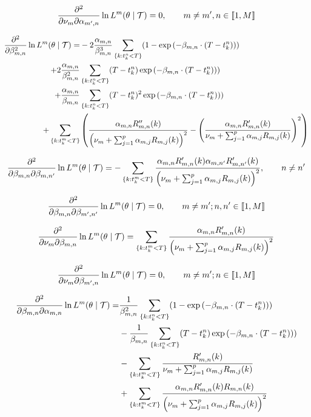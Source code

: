 \begin{equation}
\frac{\partial^2  } {\partial \nu_m \partial \alpha_{m',n} } \ln L^m ( \theta \mid \mathcal{T} ) = 0 , \qquad m \neq m', n \in  \llbracket 1, M \rrbracket
\end{equation}



\begin{align}
\frac{\partial^2 } {\partial \beta_{m,n}^2} \ln L^m ( \theta \mid \mathcal{T} ) = & - 2 \frac {\alpha_{m,n}} {\beta_{m,n}^3} \sum_{ \{k : t_k^n < T \} } ( 1 - \exp \left ( - \beta_{m,n} \cdot ( T - t_k^n ) \right ) ) \notag \\ 
+  2 \frac{ \alpha_{m,n} } { \beta_{m,n}^2 } & \sum_{ \{k : t_k^n < T \} } ( T-t_k^n) \exp \left ( - \beta_{m,n} \cdot ( T - t_k^n ) \right ) )  \notag \\
+ \frac{ \alpha_{m,n} } { \beta_{m,n} } & \sum_{ \{k : t_k^n < T \} } ( T-t_k^n)^2 \exp \left ( - \beta_{m,n} \cdot ( T - t_k^n ) \right ) )  \notag \\ 
+ \sum_{ \{k : t_k^m < T \} } & \left (  \frac{\alpha_{m,n} R''_{m,n} (k) }{ \left ( \nu_m + \sum_{j=1}^p \alpha_{m,j} R_{m,j} (k) \right )^2} - \left ( \frac{\alpha_{m,n} R'_{m,n} (k) }{ \nu_m + \sum_{j=1}^p \alpha_{m,j} R_{m,j} (k)} \right )^2 \right ) 
\end{align}

\begin{equation}
\frac{\partial^2 } {\partial \beta_{m,n} \partial \beta_{m,n'} } \ln L^m ( \theta \mid \mathcal{T} ) =  - \sum_{ \{k : t_k^m < T \} } \frac{\alpha_{m,n} R'_{m,n}(k) \alpha_{m,n'} R'_{m,n'}(k) }{ \left ( \nu_m + \sum_{j=1}^p \alpha_{m,j} R_{m,j} (k) \right )^2}, \qquad n\neq n'
\end{equation}

\begin{equation}
\frac{\partial^2 } {\partial \beta_{m,n} \partial \beta_{m',n'} } \ln L^m ( \theta \mid \mathcal{T} ) = 0, \qquad m \neq m'; n,n' \in  \llbracket 1, M \rrbracket
\end{equation}



\begin{equation}
\frac{\partial^2 } {\partial \nu_m \partial \beta_{m,n} } \ln L^m ( \theta \mid \mathcal{T} ) = \sum_{ \{k : t_k^m < T \} } \frac{\alpha_{m,n} R'_{m,n}(k)}{\left ( \nu_m + \sum_{j=1}^p \alpha_{m,j} R_{m,j} (k) \right )^2}
\end{equation}

\begin{equation}
\frac{\partial^2 } {\partial \nu_m \partial \beta_{m',n} } \ln L^m ( \theta \mid \mathcal{T} ) = 0, \qquad m \neq m'; n \in  \llbracket 1, M \rrbracket
\end{equation}


\begin{align}
\frac{\partial^2 } { \partial \beta_{m,n} \partial \alpha_{m,n} }  \ln L^m ( \theta \mid \mathcal{T} ) =  & \frac {1} {\beta_{m,n}^2} \sum_{ \{k : t_k^n < T \} } ( 1 - \exp \left ( - \beta_{m,n} \cdot ( T - t_k^n ) \right ) ) \notag \\ 
&-  \frac{ 1 } { \beta_{m,n} } \sum_{ \{k : t_k^n < T \} } ( T-t_k^n) \exp \left ( - \beta_{m,n} \cdot ( T - t_k^n ) \right ) ) \notag \\ 
&- \sum_{ \{k : t_k^m < T \} } \frac{ R'_{m,n} (k) }{ \nu_m + \sum_{j=1}^p \alpha_{m,j} R_{m,j} (k)  } \notag \\
&+ \sum_{ \{k : t_k^m < T \} } \frac{ \alpha_{m,n} R'_{m,n} (k) R_{m,n}(k) }{ \left ( \nu_m + \sum_{j=1}^p \alpha_{m,j} R_{m,j} (k) \right )^2 }
\end{align}

